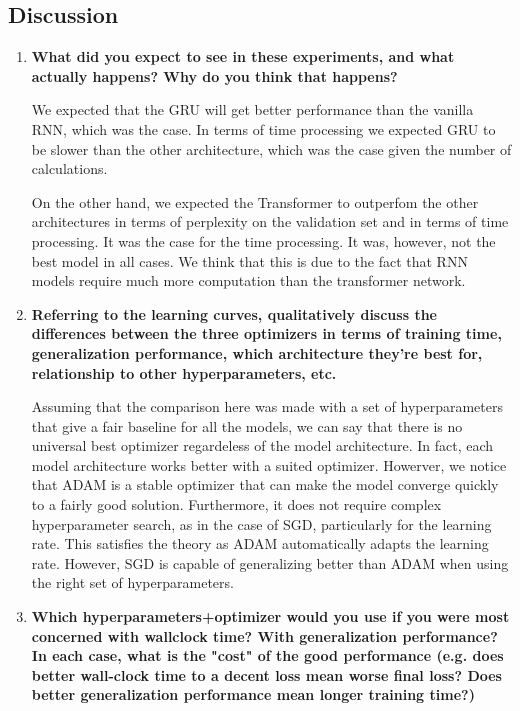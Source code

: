 \subsection{Discussion}
\begin{enumerate}
	\item \textbf{What did you expect to see in these experiments, and what actually happens? Why do you
think that happens?}

We expected that the GRU will get better performance than the vanilla RNN, which was the case. In terms of time processing we expected  GRU to be slower than the other architecture,  which was the case given the number of calculations.

On the other hand, we expected the Transformer to outperfom the other architectures in terms of perplexity on the validation set and in terms of time processing. It was the case for the time processing. It was, however, not the best model in all cases. We think that this is due to the fact that RNN models require much more computation than the transformer network. 


\item \textbf{Referring to the learning curves, qualitatively discuss the differences between the three optimizers
in terms of training time, generalization performance, which architecture they're best
for, relationship to other hyperparameters, etc.}

Assuming that the comparison here was made with a set of hyperparameters that give a fair baseline for all the models, we can say that there is no universal best optimizer regardeless of the model architecture. In fact, each model architecture works better with a suited optimizer. Howerver, we notice that ADAM is a stable optimizer that can make the model converge quickly to a fairly good solution. Furthermore, it does not require complex hyperparameter search, as in the case of SGD, particularly for the learning rate. This satisfies the theory as ADAM automatically adapts the learning rate. However, SGD is capable of generalizing better than ADAM when using the right set of hyperparameters. 

\item \textbf{Which hyperparameters+optimizer would you use if you were most concerned with wallclock time? With generalization performance? In each case, what is the "cost" of the good performance (e.g. does better wall-clock time to a decent loss mean worse final loss? Does better generalization performance mean longer training time?)}


\end{enumerate}
